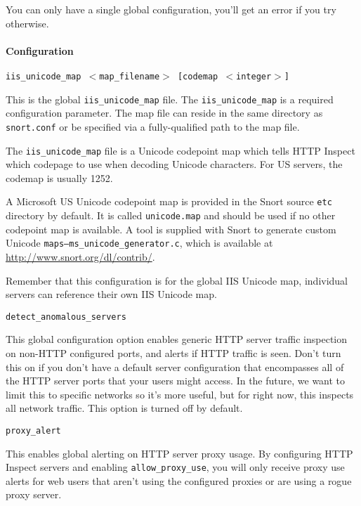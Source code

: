 \documentclass[english]{report}
\newcounter{slistnum}
\newenvironment{slist}
{ \begin{list}{ {\bf \arabic{slistnum}.} }{\usecounter{slistnum} } }
{ \end{list} }
\newenvironment{note}{
\samepage
    \vspace{10pt}{\textsf{
        {\hspace{7pt}\Huge{$\triangle$\hspace{-12.5pt}{\Large{$^!$}}}}\hspace{5pt}
        {\Large{NOTE}}
    }
    }
   \begin{center}
    \par\vspace{-17pt}

    \begin{lrbox}{\savepar}
    \begin{minipage}[r]{6in}
}
{
    \end{minipage}
    \end{lrbox}
    \fbox{
        \usebox{
            \savepar
	}
    }
    \par\vskip10pt
    \end{center}
}
\newenvironment{note}{
        \begin{rawhtml}
        <p><table border="1"><tr><td><b>
        Note:&nbsp;&nbsp;</b>
        \end{rawhtml}
}{
        \begin{rawhtml}
        </b></td></tr></table></p>
        \end{rawhtml}
}
\begin{document}
You can only have a single global configuration, you'll get an error if you try
otherwise.

\paragraph{Configuration}
\begin{slist}
\item \texttt{iis\_unicode\_map $<$map\_filename$>$ [codemap $<$integer$>$]}

This is the global \texttt{iis\_unicode\_map} file.  The
\texttt{iis\_unicode\_map} is a required configuration parameter.  The map file
can reside in the same directory as \texttt{snort.conf} or be specified via a
fully-qualified path to the map file.

The \texttt{iis\_unicode\_map} file is a Unicode codepoint map which tells HTTP
Inspect which codepage to use when decoding Unicode characters.  For US
servers, the codemap is usually 1252.

A Microsoft US Unicode codepoint map is provided in the Snort source
\texttt{etc} directory by default.  It is called \texttt{unicode.map} and
should be used if no other codepoint map is available.  A tool is supplied with
Snort to generate custom Unicode \texttt{maps--ms\_unicode\_generator.c}, which
is available at \url{http://www.snort.org/dl/contrib/}.

\begin{note}

Remember that this configuration is for the global IIS Unicode map, individual
servers can reference their own IIS Unicode map.

\end{note}

\item \texttt{detect\_anomalous\_servers}

This global configuration option enables generic HTTP server traffic inspection
on non-HTTP configured ports, and alerts if HTTP traffic is seen.  Don't turn
this on if you don't have a default server configuration that encompasses all
of the HTTP server ports that your users might access.  In the future, we want
to limit this to specific networks so it's more useful, but for right now, this
inspects all network traffic. This option is turned off by default.

\item \texttt{proxy\_alert}

This enables global alerting on HTTP server proxy usage.  By configuring HTTP
Inspect servers and enabling \texttt{allow\_proxy\_use}, you will only receive
proxy use alerts for web users that aren't using the configured proxies or are
using a rogue proxy server.


\end{slist}
\end{document}
